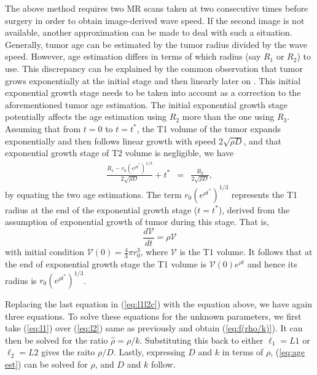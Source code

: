 \documentclass{aims}
\numberwithin{equation}{section}
\begin{document}
The above method requires two MR scans taken at two consecutive times
before surgery in order to obtain image-derived wave speed. If the
second image is not available, another approximation can be made to
deal with such a situation. Generally, tumor age can be estimated by the
tumor radius divided by the wave speed. However, age estimation differs
in terms of which radius (say $R_{1}$ or $R_{2}$) to use. This discrepancy
can be explained by the common observation that tumor grows exponentially
at the initial stage and then linearly later on \cite{Kuang}. This
initial exponential growth stage needs to be taken into account as
a correction to the aforementioned tumor age estimation. The initial
exponential growth stage potentially affects the age estimation using
$R_{2}$ more than the one using $R_{3}$. Assuming that from $t=0$
to $t=t^{*}$, the T1 volume of the tumor expands exponentially and
then follows linear growth with speed $2\sqrt{\rho D}$, and that
exponential growth stage of T2 volume is negligible, we have
\begin{eqnarray} \label{eq:age est}
\frac{R_{1}-r_{0}(e^{\rho t^{*}})^{1/3}}{2\sqrt{\rho D}}+t^{*} & = & \frac{R_{2}}{2\sqrt{\rho D}},
\end{eqnarray}
by equating the two age estimations. The term $r_{0}(e^{\rho t^{*}})^{1/3}$ represents the T1 radius at the end of the exponential growth stage ($t=t^*$), derived from the assumption of exponential growth of tumor during this stage. That is,
\begin{equation}
    \frac{d\mathcal{V}}{dt}=\rho \mathcal{V}
\end{equation}
with initial condition $\mathcal{V}(0)=\frac{4}{3}\pi r_0^3$, where $\mathcal{V}$ is the T1 volume. It follows that at the end of exponential growth stage the T1 volume is $\mathcal{V}(0) e^{\rho t}$ and hence its radius is  $r_{0}(e^{\rho t^{*}})^{1/3}$. 

Replacing the last equation in (\ref{eq:l1l2c})
with the equation above, we have again three equations. To solve these equations for the unknown parameters, we first take 
(\ref{eq:l1}) over (\ref{eq:l2}) same as previously and obtain (\ref{eq:f(rho/k)}). It can then be solved for the ratio $\hat{\rho}=\rho/k$. Substituting this back to either $\ell_1=L1$ or $\ell_2=L2$ gives the raito $\rho/D$. Lastly, expressing $D$ and $k$ in terms of $\rho$, (\ref{eq:age est}) can be solved for $\rho$, and $D$ and $k$ follow.
\end{document}
